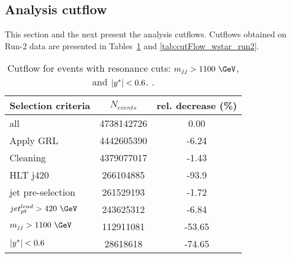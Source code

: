 %
%
%


\subsection{Analysis cutflow}

This section and the next present the analysis cutflows. Cutflows obtained on
Run-2 data are presented in Tables~\ref{tab:cutFlow_resonance_run2} and 
\ref{tab:cutFlow_wstar_run2}.



\begin{table}[htbp]
	\centering
	\begin{tabular}{l|c|c}
		\hline\hline
		Selection criteria & $N_{events}$ & rel. decrease (\%) \\
		\hline
		all      &	4738142726	&	0.00	\\
		Apply GRL 	& 	4442605390        & 	-6.24	 \\
		Cleaning	 & 	4379077017	 & 	-1.43	 \\
		HLT j420	 & 	266104885	 & 	-93.9	 \\
		jet pre-selection	 &     261529193        &      -1.72    \\
		$jet_{pt}^{lead}>420~\GeV$ &   243625312	 & -6.84 \\
		$\mjj>1100~\GeV$	 & 	112911081	 & 	-53.65	 \\
		$|y^\ast| < 0.6$	 & 	28618618	 & 	-74.65	 \\
		\hline\hline
	\end{tabular}
	\caption{Cutflow for
		events with resonance cuts:  $m_{jj}>1100~\GeV$, and $|y^\ast|<0.6$. .
		\label{tab:cutFlow_resonance_run2} }
\end{table}

